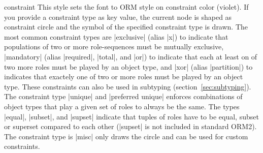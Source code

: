 \documentclass[a4paper,10pt]{article}
\begin{document}
\begin{stylekey}{constraint}
  This style sets the font to ORM style on constraint color (violet). If you provide a constraint type as key value, the current node is shaped as constraint circle and the symbol of the specified constraint type is drawn. The most common constraint types are |exclusive| (alias |x|) to indicate that populations of two or more role-sequences must be mutually exclusive, |mandatory| (alias |required|, |total|, and |or|) to indicate that each at least on of two more roles must be played by an object type, and |xor| (alias |partition|) to indicates that exactely one of two or more roles must be played by an object type. These constraints can also be used in subtyping (section~\ref{sec:subtyping}). The constraint type |unique| and |preferred unique| enforces combinations of object types that play a given set of roles to always be the same. The types |equal|, |subset|, and |supset| indicate that tuples of roles have to be equal, subset or superset compared to each other (|supset| is not included in standard ORM2). The constraint type is |misc| only draws the circle and can be used for custom constraints.
\begin{codeexample}[]
\end{codeexample}
\end{stylekey}
\end{document}
